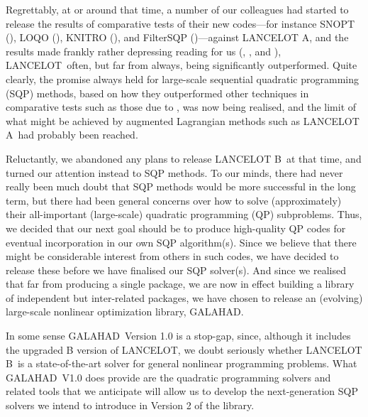 \documentclass[twoside]{article}
\newcommand{\gal}{{\sf GALAHAD}}
\newcommand{\lan}{{\sf LANCELOT}}
\newcommand{\lana}{{\sf LANCELOT A}}
\newcommand{\lanb}{{\sf LANCELOT B}}
\begin{document}
Regrettably, at or around that time, a number of our colleagues 
had started to release the results of comparative tests of their
new codes---for instance SNOPT (),
LOQO (), 
KNITRO (), and
FilterSQP ()---against \lana,
and the results made frankly rather depressing reading for us
(, , and ), \lan\
often, but far from always, being significantly outperformed. 
Quite clearly, the promise always held for large-scale 
sequential quadratic programming (SQP) methods,
based on how they outperformed other techniques in comparative tests
such as those due to \cite{HockSchi81}, was now being realised, and the 
limit of what might be achieved by augmented Lagrangian methods
such as \lana\ had probably been reached.

Reluctantly, we abandoned any plans to release \lanb\ at that time, and turned
our attention instead to SQP methods. To our minds, there had never
really been much doubt that SQP methods would be more successful in the
long term, but there had been  general concerns over 
how to solve (approximately) their all-important (large-scale) quadratic 
programming (QP) subproblems. Thus, we decided that our next goal
should be to produce high-quality QP codes for eventual incorporation 
in our own SQP algorithm(s). Since we believe that there might
be considerable interest from others in such codes, we have decided to release
these before we have finalised our SQP solver(s). And since we realised that
far from producing a single package, we are now in effect building a 
library of independent but inter-related packages, we have chosen to
release an (evolving) large-scale nonlinear optimization library, \gal.

In some sense \gal\ Version 1.0 is a stop-gap, since, although
it includes the upgraded B version of \lan, we doubt seriously whether 
\lanb\ is a state-of-the-art solver for general nonlinear programming
problems. What \gal\ V1.0 does provide are the quadratic programming solvers
and related tools that we anticipate will allow us to develop the 
next-generation SQP solvers 
we intend to introduce in Version 2 of the library.


\end{document}
